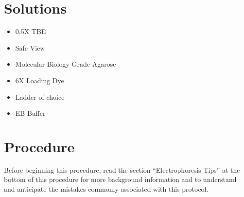 \documentclass[
  letterpaper,
  DIV=11,
  numbers=noendperiod]{scrreprt}
\providecommand{\tightlist}{%
  \setlength{\itemsep}{0pt}\setlength{\parskip}{0pt}}\usepackage{longtable,booktabs,array}
\begin{document}
\hypertarget{solutions-20}{%
\section{Solutions}\label{solutions-20}}

\begin{itemize}
\tightlist
\item
  0.5X TBE
\item
  Safe View
\item
  Molecular Biology Grade Agarose
\item
  6X Loading Dye
\item
  Ladder of choice
\item
  EB Buffer
\end{itemize}

\hypertarget{procedure-22}{%
\section{Procedure}\label{procedure-22}}

\begin{tcolorbox}[enhanced jigsaw, rightrule=.15mm, title=\textcolor{quarto-callout-important-color}{\faExclamation}\hspace{0.5em}{This is important}, titlerule=0mm, opacitybacktitle=0.6, toprule=.15mm, bottomrule=.15mm, opacityback=0, left=2mm, colframe=quarto-callout-important-color-frame, breakable, coltitle=black, colback=white, colbacktitle=quarto-callout-important-color!10!white, bottomtitle=1mm, leftrule=.75mm, toptitle=1mm, arc=.35mm]

Before beginning this procedure, read the section ``Electrophoresis
Tips'' at the bottom of this procedure for more background information
and to understand and anticipate the mistakes commonly associated with
this protocol.

\end{tcolorbox}
\end{document}
